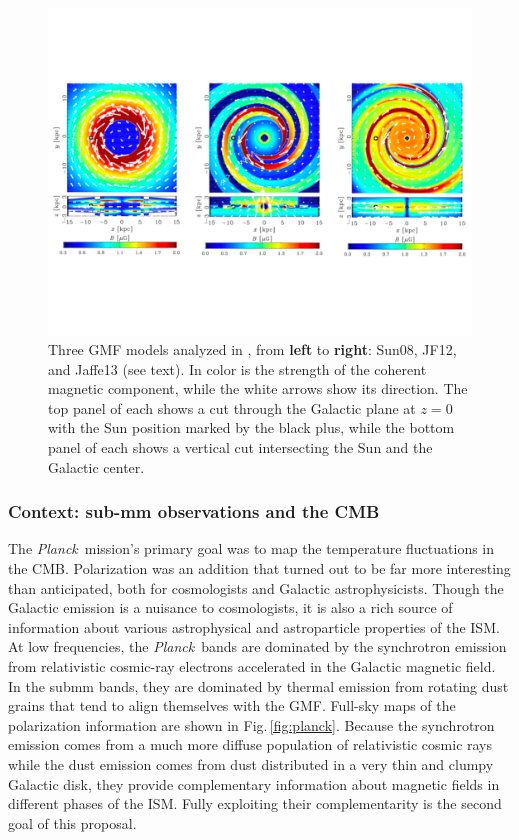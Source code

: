 \documentclass[12pt]{article}
\newcommand{\planck}{\textit{Planck}}
\begin{document}
\begin{figure}
\includegraphics[width=\textwidth]{views_lowres.pdf}
\caption{Three GMF models analyzed in \citet{pipXLII}, from {\bf left}
    to {\bf right}: Sun08, JF12, and Jaffe13 (see text). In 
color is the strength of the coherent magnetic component, while the white arrows show its direction. The top panel of each shows a cut through the Galactic plane at $z=0$ with the Sun position marked by the black plus, while the bottom panel of each shows a vertical cut intersecting the Sun and the Galactic center.} 
\label{fig:gmfs}
\end{figure} 

\subsubsection*{Context:  sub-mm observations and the CMB}

The \planck\ mission's primary goal was to map the temperature fluctuations in the CMB.  Polarization was an addition that turned out to be far more interesting than anticipated, both for cosmologists and Galactic astrophysicists. Though the Galactic emission is a nuisance to cosmologists, it is also a rich source of information about various astrophysical and astroparticle properties of the ISM. At low frequencies, the \planck\ bands are dominated by the synchrotron emission from relativistic cosmic-ray electrons accelerated in the Galactic magnetic field. In the submm bands, they are dominated by thermal emission from rotating dust grains that tend to align themselves with the GMF.  Full-sky maps of the polarization information are shown in Fig.\,\ref{fig:planck}.   Because the synchrotron emission comes from a much more diffuse population of relativistic cosmic rays while the dust emission comes from dust distributed in a very thin and clumpy Galactic disk, they provide complementary information about magnetic fields in different phases of the ISM.  Fully exploiting their complementarity is the second goal of this proposal.  
\end{document}
